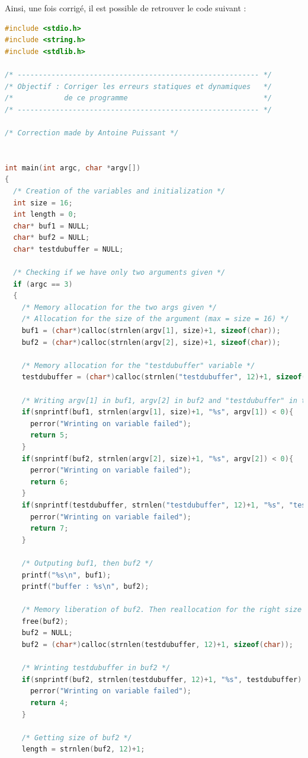 Ainsi, une fois corrigé, il est possible de retrouver le code suivant :
\begin{lstlisting}[language=C]
#include <stdio.h>
#include <string.h>
#include <stdlib.h>

/* --------------------------------------------------------- */
/* Objectif : Corriger les erreurs statiques et dynamiques   */
/*            de ce programme                                */
/* --------------------------------------------------------- */

/* Correction made by Antoine Puissant */


int main(int argc, char *argv[])
{
  /* Creation of the variables and initialization */
  int size = 16;
  int length = 0;
  char* buf1 = NULL;
  char* buf2 = NULL;
  char* testdubuffer = NULL;

  /* Checking if we have only two arguments given */
  if (argc == 3)
  {
    /* Memory allocation for the two args given */
    /* Allocation for the size of the argument (max = size = 16) */
    buf1 = (char*)calloc(strnlen(argv[1], size)+1, sizeof(char));
    buf2 = (char*)calloc(strnlen(argv[2], size)+1, sizeof(char));

    /* Memory allocation for the "testdubuffer" variable */
    testdubuffer = (char*)calloc(strnlen("testdubuffer", 12)+1, sizeof(char));

    /* Writing argv[1] in buf1, argv[2] in buf2 and "testdubuffer" in testdubuffer */
    if(snprintf(buf1, strnlen(argv[1], size)+1, "%s", argv[1]) < 0){
      perror("Wrinting on variable failed");
      return 5;
    }
    if(snprintf(buf2, strnlen(argv[2], size)+1, "%s", argv[2]) < 0){
      perror("Wrinting on variable failed");
      return 6;
    }
    if(snprintf(testdubuffer, strnlen("testdubuffer", 12)+1, "%s", "testdubuffer") < 0){
      perror("Wrinting on variable failed");
      return 7;
    }

    /* Outputing buf1, then buf2 */
    printf("%s\n", buf1);
    printf("buffer : %s\n", buf2);
      
    /* Memory liberation of buf2. Then reallocation for the right size */		
    free(buf2);
    buf2 = NULL;
    buf2 = (char*)calloc(strnlen(testdubuffer, 12)+1, sizeof(char));

    /* Wrinting testdubuffer in buf2 */
    if(snprintf(buf2, strnlen(testdubuffer, 12)+1, "%s", testdubuffer) < 0){
      perror("Wrinting on variable failed");
      return 4;
    }

    /* Getting size of buf2 */
    length = strnlen(buf2, 12)+1;


\end{lstlisting}

